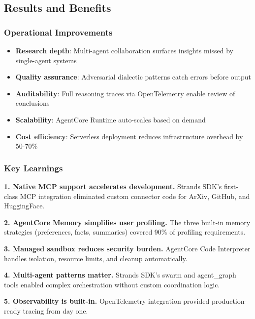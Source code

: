 \subsection{Results and Benefits}\label{results-and-benefits}

\subsubsection{Operational Improvements}\label{operational-improvements}

\begin{itemize}
\tightlist
\item
  \textbf{Research depth}: Multi-agent collaboration surfaces insights
  missed by single-agent systems
\item
  \textbf{Quality assurance}: Adversarial dialectic patterns catch
  errors before output
\item
  \textbf{Auditability}: Full reasoning traces via OpenTelemetry enable
  review of conclusions
\item
  \textbf{Scalability}: AgentCore Runtime auto-scales based on demand
\item
  \textbf{Cost efficiency}: Serverless deployment reduces infrastructure
  overhead by 50-70\%
\end{itemize}

\subsubsection{Key Learnings}\label{key-learnings}

\begin{tcolorbox}[colback=blue!5!white, colframe=blue!75!black, title=Implementation Insights]

\textbf{1. Native MCP support accelerates development.} Strands SDK's first-class MCP integration eliminated custom connector code for ArXiv, GitHub, and HuggingFace.

\textbf{2. AgentCore Memory simplifies user profiling.} The three built-in memory strategies (preferences, facts, summaries) covered 90\% of profiling requirements.

\textbf{3. Managed sandbox reduces security burden.} AgentCore Code Interpreter handles isolation, resource limits, and cleanup automatically.

\textbf{4. Multi-agent patterns matter.} Strands SDK's swarm and agent\_graph tools enabled complex orchestration without custom coordination logic.

\textbf{5. Observability is built-in.} OpenTelemetry integration provided production-ready tracing from day one.

\end{tcolorbox}

